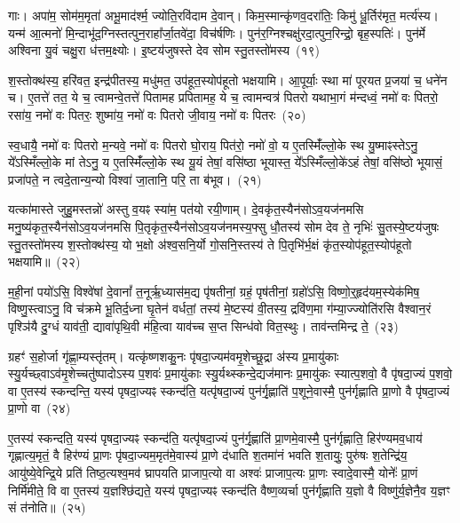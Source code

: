 गाः। अपा॑म॒ सोम॑म॒मृता॑ अभू॒माद॑र्श्म॒ ज्योति॒रवि॑दाम दे॒वान्। किम॒स्मान्कृ॑णव॒दरा॑तिः॒ किमु॑ धू॒र्तिर॑मृत॒ मर्त्य॑स्य। यन्म॑ आ॒त्मनो॑ मि॒न्दाभू॑द॒ग्निस्तत्पुन॒राहा᳚र्जा॒तवे॑दा॒ विच॑र्\mbox{}षणिः। पुन॑र॒ग्निश्चक्षु॑रदा॒त्पुन॒रिन्द्रो॒ बृह॒स्पतिः॑। पुन॑र्मे अश्विना यु॒वं चक्षु॒रा ध॑त्तम॒क्ष्योः। इ॒ष्टय॑जुषस्ते देव सोम स्तु॒तस्तो॑मस्य~(१९)

श॒स्तोक्थ॑स्य॒ हरि॑वत॒ इन्द्र॑पीतस्य॒ मधु॑मत॒ उप॑हूत॒स्योप॑हूतो भक्षयामि। आ॒पूर्याः॒ स्था मा॑ पूरयत प्र॒जया॑ च॒ धने॑न च। ए॒तत्ते॑ तत॒ ये च॒ त्वामन्वे॒तत्ते॑ पितामह प्रपितामह॒ ये च॒ त्वामन्वत्र॑ पितरो यथाभा॒गं म॑न्दध्वं॒ नमो॑ वः पितरो॒ रसा॑य॒ नमो॑ वः पितरः॒ शुष्मा॑य॒ नमो॑ वः पितरो जी॒वाय॒ नमो॑ वः पितरः~(२०)

स्व॒धायै॒ नमो॑ वः पितरो म॒न्यवे॒ नमो॑ वः पितरो घो॒राय॒ पित॑रो॒ नमो॑ वो॒ य ए॒तस्मिँ॑ल्लो॒के स्थ यु॒ष्माꣴस्ते\-ऽनु॒ ये᳚\-ऽस्मिँल्लो॒के मां ते\-ऽनु॒ य ए॒तस्मिँ॑ल्लो॒के स्थ यू॒यं तेषां॒ वसि॑ष्ठा भूयास्त॒ ये᳚\-ऽस्मिँल्लो॒के॑\-ऽहं तेषां॒ वसि॑ष्ठो भूयासं॒ प्रजा॑पते॒ न त्वदे॒तान्य॒न्यो विश्वा॑ जा॒तानि॒ परि॒ ता ब॑भूव।~(२१)

यत्का॑मास्ते जुहु॒मस्तन्नो॑ अस्तु व॒यꣴ स्या॑म॒ पत॑यो रयी॒णाम्। दे॒वकृ॑त॒स्यैन॑सो\-ऽव॒यज॑नमसि मनु॒ष्य॑कृत॒स्यैन॑सो\-ऽ\-व॒यज॑नमसि पि॒तृकृ॑त॒स्यैन॑सो\-ऽव॒यज॑नमस्य॒फ्सु धौ॒तस्य॑ सोम देव ते॒ नृभिः॑ सु॒तस्ये॒ष्टय॑जुषः स्तु॒तस्तो॑मस्य श॒स्तोक्थ॑स्य॒ यो भ॒क्षो अ॑श्व॒सनि॒र्यो गो॒सनि॒स्तस्य॑ ते पि॒तृभि॑र्भ॒क्षं कृ॑त॒स्योप॑हूत॒स्योप॑हूतो भक्षयामि॥~(२२)

{}%

म॒ही॒नां पयो॑\-ऽसि॒ विश्वे॑षां दे॒वानां᳚ त॒नूर्\mbox{}ऋ॒ध्यास॑म॒द्य पृ॑षतीनां॒ ग्रहं॒ पृष॑तीनां॒ ग्रहो॑\-ऽसि॒ विष्णो॒र्॒\mbox{}हृद॑यम॒स्येक॑मिष॒ विष्णु॒स्त्वा\-ऽनु॒ वि च॑क्रमे भू॒तिर्द॒ध्ना घृ॒तेन॑ वर्धतां॒ तस्य॑ मे॒ष्टस्य॑ वी॒तस्य॒ द्रवि॑ण॒मा ग॑म्या॒ज्ज्योति॑रसि वैश्वान॒रं पृश्ञि॑यै दु॒ग्धं याव॑ती॒ द्यावा॑\-पृथि॒वी म॑हि॒त्वा याव॑च्च स॒प्त सिन्ध॑वो वित॒स्थुः। ताव॑न्तमिन्द्र ते॒~(२३)

ग्रहꣳ॑ स॒होर्जा गृ॑ह्णा॒म्यस्तृ॑तम्। यत्कृ॑ष्णशकु॒नः पृ॑षदा॒ज्यम॑व\-मृ॒शेच्छू॒द्रा अ॑स्य प्र॒मायु॑काः स्यु॒र्यच्छ्वा\-ऽव॑मृ॒शेच्चतु॑ष्पादो\-ऽस्य प॒शवः॑ प्र॒मायु॑काः स्यु॒र्यथ्स्कन्दे॒द्यज॑मानः प्र॒मायु॑कः स्यात्प॒शवो॒ वै पृ॑षदा॒ज्यं प॒शवो॒ वा ए॒तस्य॑ स्कन्दन्ति॒ यस्य॑ पृषदा॒ज्यꣴ स्कन्द॑ति॒ यत्पृ॑षदा॒ज्यं पुन॑र्गृ॒ह्णाति॑ प॒शूने॒वास्मै॒ पुन॑र्गृह्णाति प्रा॒णो वै पृ॑षदा॒ज्यं प्रा॒णो वा~(२४)

ए॒तस्य॑ स्कन्दति॒ यस्य॑ पृषदा॒ज्यꣴ स्कन्द॑ति॒ यत्पृ॑षदा॒ज्यं पुन॑र्गृ॒ह्णाति॑ प्रा॒णमे॒वास्मै॒ पुन॑र्गृह्णाति॒ हिर॑ण्यमव॒धाय॑ गृह्णात्य॒मृतं॒ वै हिर॑ण्यं प्रा॒णः पृ॑षदा॒ज्यम॒मृत॑मे॒वास्य॑ प्रा॒णे द॑धाति श॒तमा॑नं भवति श॒तायुः॒ पुरु॑षः श॒तेन्द्रि॑य॒ आयु॑ष्ये॒वेन्द्रि॒ये प्रति॑ तिष्ठ॒त्यश्व॒मव॑ घ्रापयति प्राजाप॒त्यो वा अश्वः॑ प्राजाप॒त्यः प्रा॒णः स्वादे॒वास्मै॒ योनेः᳚ प्रा॒णं निर्मि॑मीते॒ वि वा ए॒तस्य॑ य॒ज्ञश्छि॑द्यते॒ यस्य॑ पृषदा॒ज्यꣴ स्कन्द॑ति वैष्ण॒व्यर्चा पुन॑र्गृह्णाति य॒ज्ञो वै विष्णु॑र्य॒ज्ञेनै॒व य॒ज्ञꣳ सं त॑नोति॥~(२५)

